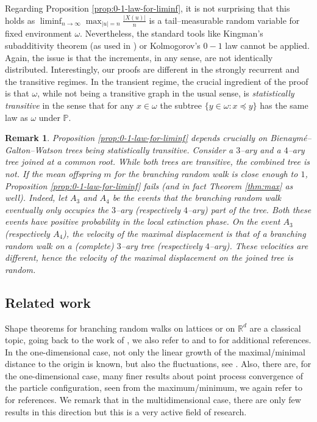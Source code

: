\documentclass[11 pt]{article}
\newtheorem{remark}[theorem]{Remark}
\theoremstyle{definition}
\numberwithin{equation}{section}
\newcommand\TODO[1]{\texttt{\textcolor{red}{[#1]}}} %
\newcommand{\PP}{\mathbb{P}} %
\begin{document}
Regarding Proposition \ref{prop:0-1-law-for-liminf}, it is not surprising that this holds as $\liminf_{n\to\infty} \max_{\vert u \vert = n} \frac{\vert X(u) \vert}{n}$ is a tail--measurable random variable for fixed environment $\omega$. Nevertheless, the standard tools like Kingman's subadditivity theorem (as used in \cite[Section 1.4]{shi_branching_2015}) or Kolmogorov's $0-1$ law cannot be applied. Again, the issue is that the increments, in any sense, are not identically distributed. 
 Interestingly, our proofs are different in the strongly recurrent and the transitive regimes. In the transient regime, the crucial ingredient of the proof is that $\omega$, while not being a transitive graph in the usual sense, is \emph{statistically transitive} in the sense that for any $x\in \omega$ the subtree $\{y\in \omega: x \preceq y\}$ has the same law as $\omega$ under $\PP$. 



\begin{remark}
	Proposition \ref{prop:0-1-law-for-liminf} depends crucially on Bienaymé--Galton--Watson trees being statistically transitive. Consider a $3$--ary and a $4$--ary tree joined at a common root. While both trees are transitive, the combined tree is not. If the mean offspring $m$ for the branching random walk is close enough to $1$, Proposition \ref{prop:0-1-law-for-liminf} fails (and in fact Theorem \ref{thm:max} as well). Indeed, let $A_3$ and $A_4$ be the events that the branching random walk eventually only occupies the $3$--ary (respectively $4$--ary) part of the tree. Both these events have positive probability in the local extinction phase. On the event $A_3$ (respectively $A_4$), the velocity of the maximal displacement is that of a branching random walk on a (complete) $3$--ary tree (respectively $4$--ary). These velocities are different, hence the velocity of the maximal displacement on the joined tree is random. 
\end{remark}

\subsection{Related work}\label{Related work}

Shape theorems for branching random walks on lattices or on $\mathbb{R}^d$ are a classical topic, going back to the work of \cite{76:biggins:first, J.M.Hammersley1974, 75:kingman:first}, we also refer to
\cite{lyons_probability_2016} and to \cite{shi_branching_2015} for additional references. In the one-dimensional case, not only the linear growth of the maximal/minimal distance to the origin is known, but also the fluctuations, see \cite{aidekon_convergence_2013}. Also, there are, for the one-dimensional case, many finer results about point process convergence of the particle configuration, seen from the maximum/minimum, we again refer to \cite{shi_branching_2015} for references. We remark that in the multidimensional case, there are only few results in this direction but this is a very active field of research.
\end{document}
